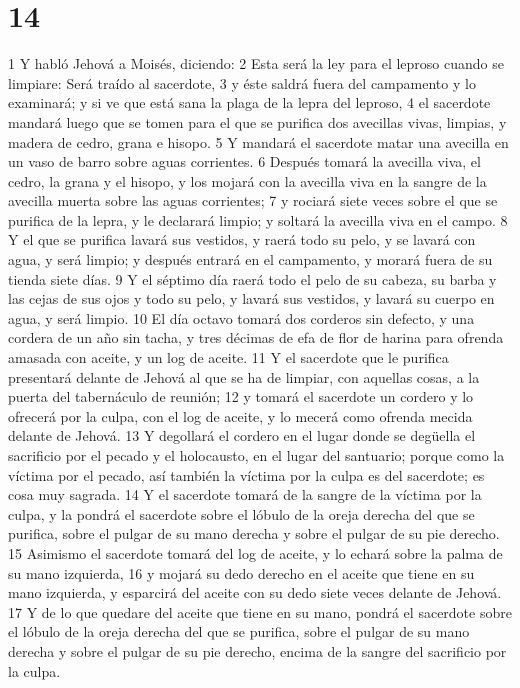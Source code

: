 \chapter{14}

1 Y habló Jehová a Moisés, diciendo:
2 Esta será la ley para el leproso cuando se limpiare: Será traído al sacerdote,
3 y éste saldrá fuera del campamento y lo examinará; y si ve que está sana la plaga de la lepra del leproso,
4 el sacerdote mandará luego que se tomen para el que se purifica dos avecillas vivas, limpias, y madera de cedro, grana e hisopo.
5 Y mandará el sacerdote matar una avecilla en un vaso de barro sobre aguas corrientes.
6 Después tomará la avecilla viva, el cedro, la grana y el hisopo, y los mojará con la avecilla viva en la sangre de la avecilla muerta sobre las aguas corrientes;
7 y rociará siete veces sobre el que se purifica de la lepra, y le declarará limpio; y soltará la avecilla viva en el campo.
8 Y el que se purifica lavará sus vestidos, y raerá todo su pelo, y se lavará con agua, y será limpio; y después entrará en el campamento, y morará fuera de su tienda siete días.
9 Y el séptimo día raerá todo el pelo de su cabeza, su barba y las cejas de sus ojos y todo su pelo, y lavará sus vestidos, y lavará su cuerpo en agua, y será limpio.
10 El día octavo tomará dos corderos sin defecto, y una cordera de un año sin tacha, y tres décimas de efa   de flor de harina para ofrenda amasada con aceite, y un log de aceite.
11 Y el sacerdote que le purifica presentará delante de Jehová al que se ha de limpiar, con aquellas cosas, a la puerta del tabernáculo de reunión;
12 y tomará el sacerdote un cordero y lo ofrecerá por la culpa, con el log   de aceite, y lo mecerá como ofrenda mecida delante de Jehová.
13 Y degollará el cordero en el lugar donde se degüella el sacrificio por el pecado y el holocausto, en el lugar del santuario; porque como la víctima por el pecado, así también la víctima por la culpa es del sacerdote; es cosa muy sagrada.
14 Y el sacerdote tomará de la sangre de la víctima por la culpa, y la pondrá el sacerdote sobre el lóbulo de la oreja derecha del que se purifica, sobre el pulgar de su mano derecha y sobre el pulgar de su pie derecho.
15 Asimismo el sacerdote tomará del log   de aceite, y lo echará sobre la palma de su mano izquierda,
16 y mojará su dedo derecho en el aceite que tiene en su mano izquierda, y esparcirá del aceite con su dedo siete veces delante de Jehová.
17 Y de lo que quedare del aceite que tiene en su mano, pondrá el sacerdote sobre el lóbulo de la oreja derecha del que se purifica, sobre el pulgar de su mano derecha y sobre el pulgar de su pie derecho, encima de la sangre del sacrificio por la culpa.
